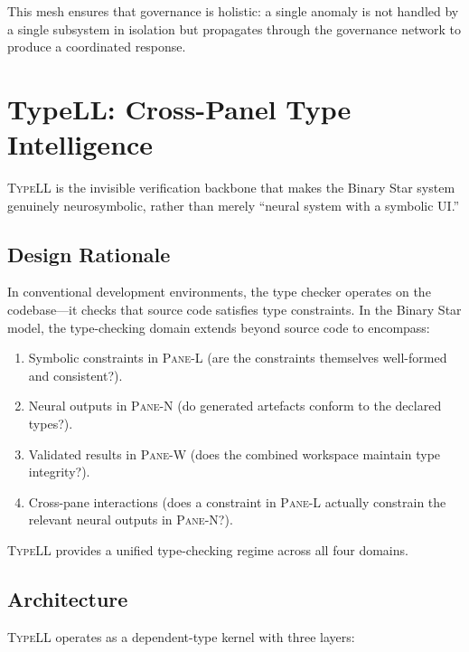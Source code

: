 \documentclass[11pt,a4paper]{article}
\newcommand{\paneL}{\textsc{Pane-L}}
\newcommand{\paneN}{\textsc{Pane-N}}
\newcommand{\paneW}{\textsc{Pane-W}}
\newcommand{\typell}{\textsc{TypeLL}}
\begin{document}
This mesh ensures that governance is holistic: a single anomaly
is not handled by a single subsystem in isolation but propagates
through the governance network to produce a coordinated response.

\section{TypeLL: Cross-Panel Type Intelligence}\label{sec:typell}

\typell{} is the invisible verification backbone that makes the
Binary Star system genuinely neurosymbolic, rather than merely
``neural system with a symbolic UI.''

\subsection{Design Rationale}

In conventional development environments, the type checker operates
on the codebase---it checks that source code satisfies type
constraints. In the Binary Star model, the type-checking domain
extends beyond source code to encompass:

\begin{enumerate}
  \item Symbolic constraints in \paneL{} (are the constraints
    themselves well-formed and consistent?).
  \item Neural outputs in \paneN{} (do generated artefacts
    conform to the declared types?).
  \item Validated results in \paneW{} (does the combined
    workspace maintain type integrity?).
  \item Cross-pane interactions (does a constraint in \paneL{}
    actually constrain the relevant neural outputs in \paneN{}?).
\end{enumerate}

\typell{} provides a unified type-checking regime across all four
domains.

\subsection{Architecture}

\typell{} operates as a dependent-type kernel with three layers:
\end{document}
